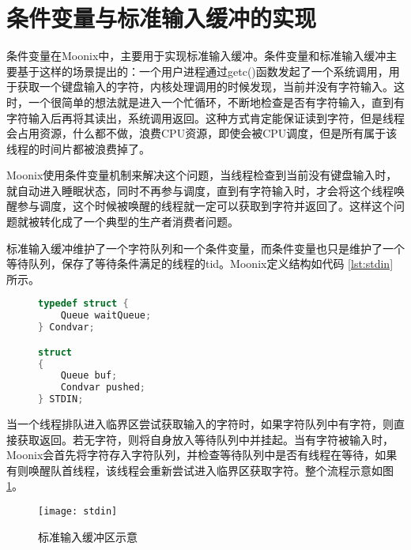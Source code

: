 \section{条件变量与标准输入缓冲的实现}
\label{sec:condition}

条件变量在Moonix中，主要用于实现标准输入缓冲。条件变量和标准输入缓冲主要基于这样的场景提出的：一个用户进程通过getc()函数发起了一个系统调用，用于获取一个键盘输入的字符，内核处理调用的时候发现，当前并没有字符输入。这时，一个很简单的想法就是进入一个忙循环，不断地检查是否有字符输入，直到有字符输入后再将其读出，系统调用返回。这种方式肯定能保证读到字符，但是线程会占用资源，什么都不做，浪费CPU资源，即使会被CPU调度，但是所有属于该线程的时间片都被浪费掉了。

Moonix使用条件变量机制来解决这个问题，当线程检查到当前没有键盘输入时，就自动进入睡眠状态，同时不再参与调度，直到有字符输入时，才会将这个线程唤醒参与调度，这个时候被唤醒的线程就一定可以获取到字符并返回了。这样这个问题就被转化成了一个典型的生产者消费者问题。

标准输入缓冲维护了一个字符队列和一个条件变量，而条件变量也只是维护了一个等待队列，保存了等待条件满足的线程的tid。Moonix定义结构如代码 \ref{lst:stdin} 所示。

\begin{figure}[htpb]
\begin{lstlisting}[language={C}, caption={标准输入缓冲和条件变量}, label={lst:stdin}]
typedef struct {
	Queue waitQueue;
} Condvar;

struct
{
	Queue buf;
	Condvar pushed;
} STDIN;
\end{lstlisting}
\end{figure}

当一个线程排队进入临界区尝试获取输入的字符时，如果字符队列中有字符，则直接获取返回。若无字符，则将自身放入等待队列中并挂起。当有字符被输入时，Moonix会首先将字符存入字符队列，并检查等待队列中是否有线程在等待，如果有则唤醒队首线程，该线程会重新尝试进入临界区获取字符。整个流程示意如图 \ref{pic:stdin}。

\begin{figure}[htpb]
	\centering
	\texttt{[image: stdin]}
	\setlength{\abovecaptionskip}{2pt}
	\caption{标准输入缓冲区示意}
	\label{pic:stdin}
\end{figure}